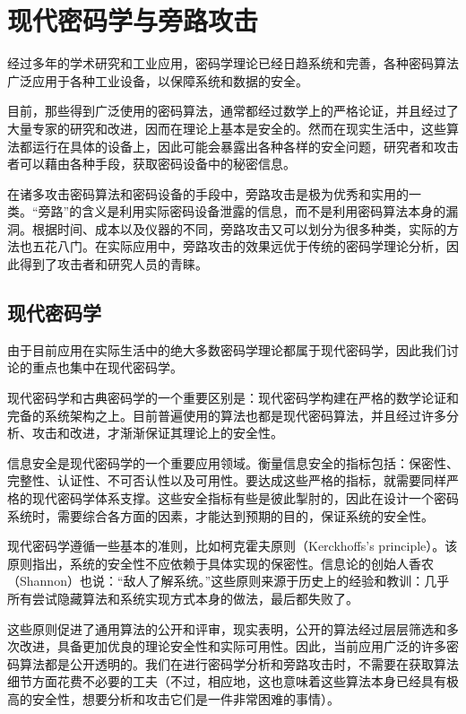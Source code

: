 
\chapter{现代密码学与旁路攻击}

经过多年的学术研究和工业应用，密码学理论已经日趋系统和完善，各种密码算法广泛应用于各种工业设备，以保障系统和数据的安全。

目前，那些得到广泛使用的密码算法，通常都经过数学上的严格论证，并且经过了大量专家的研究和改进，因而在理论上基本是安全的。然而在现实生活中，这些算法都运行在具体的设备上，因此可能会暴露出各种各样的安全问题，研究者和攻击者可以藉由各种手段，获取密码设备中的秘密信息。

在诸多攻击密码算法和密码设备的手段中，旁路攻击是极为优秀和实用的一类。“旁路”的含义是利用实际密码设备泄露的信息，而不是利用密码算法本身的漏洞。根据时间、成本以及仪器的不同，旁路攻击又可以划分为很多种类，实际的方法也五花八门。在实际应用中，旁路攻击的效果远优于传统的密码学理论分析，因此得到了攻击者和研究人员的青睐。

\section{现代密码学} %

由于目前应用在实际生活中的绝大多数密码学理论都属于现代密码学，因此我们讨论的重点也集中在现代密码学。

现代密码学和古典密码学的一个重要区别是：现代密码学构建在严格的数学论证和完备的系统架构之上。目前普遍使用的算法也都是现代密码算法，并且经过许多分析、攻击和改进，才渐渐保证其理论上的安全性。

信息安全是现代密码学的一个重要应用领域。衡量信息安全的指标包括：保密性、完整性、认证性、不可否认性以及可用性。要达成这些严格的指标，就需要同样严格的现代密码学体系支撑。这些安全指标有些是彼此掣肘的，因此在设计一个密码系统时，需要综合各方面的因素，才能达到预期的目的，保证系统的安全性。

现代密码学遵循一些基本的准则，比如柯克霍夫原则（Kerckhoffs's principle）。该原则指出，系统的安全性不应依赖于具体实现的保密性。信息论的创始人香农（Shannon）也说：“敌人了解系统。”这些原则来源于历史上的经验和教训：几乎所有尝试隐藏算法和系统实现方式本身的做法，最后都失败了。

这些原则促进了通用算法的公开和评审，现实表明，公开的算法经过层层筛选和多次改进，具备更加优良的理论安全性和实际可用性。因此，当前应用广泛的许多密码算法都是公开透明的。我们在进行密码学分析和旁路攻击时，不需要在获取算法细节方面花费不必要的工夫（不过，相应地，这也意味着这些算法本身已经具有极高的安全性，想要分析和攻击它们是一件非常困难的事情）。

